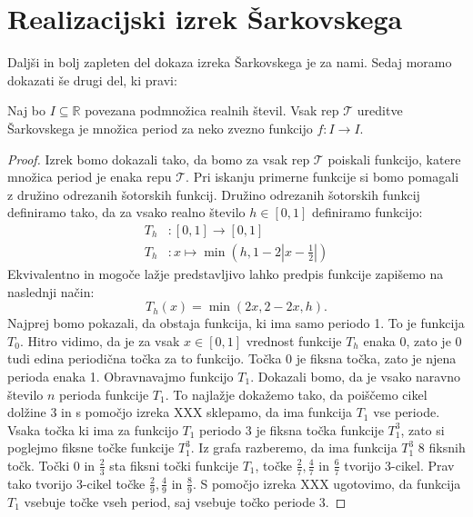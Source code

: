 \documentclass[mat2]{fmfdelo}
\newcommand{\R}{\mathbb R}
\begin{document}
\section{Realizacijski izrek Šarkovskega}\label{sec:realizacija}
Daljši in bolj zapleten del dokaza izreka Šarkovskega je za nami. Sedaj moramo dokazati še drugi del, ki pravi:
\begin{izrek}
Naj bo $I \subseteq \R$ povezana podmnožica realnih števil. Vsak rep $\mathcal{T}$ ureditve Šarkovskega je množica period za neko zvezno funkcijo $f:I \to I$.
\end{izrek}
\begin{proof}
Izrek bomo dokazali tako, da bomo za vsak rep $\mathcal{T}$ poiskali funkcijo, katere množica period je enaka repu $\mathcal{T}$. Pri iskanju primerne funkcije si bomo pomagali z družino odrezanih šotorskih funkcij. Družino odrezanih šotorskih funkcij definiramo tako, da za vsako realno število $h \in [0, 1]$ definiramo funkcijo:
\begin{equation*} %
\begin{split}
T_h &:  [0, 1] \to [0, 1] \\ 
T_h &: x \mapsto \min \left(h, 1- 2 \left|x-\frac{1}{2} \right|\right)
\end{split}
\end{equation*}
Ekvivalentno in mogoče lažje predstavljivo lahko predpis funkcije zapišemo na naslednji način:
\begin{equation*} %
T_h(x) = \min(2x, 2-2x, h).
\end{equation*}
Najprej bomo pokazali, da obstaja funkcija, ki ima samo periodo 1. To je funkcija $T_0$. Hitro vidimo, da je za vsak $x\in [0, 1]$ vrednost funkcije $T_h$ enaka 0, zato je 0 tudi edina periodična točka za to funkcijo. Točka 0 je fiksna točka, zato je njena perioda enaka 1.
Obravnavajmo funkcijo $T_1$. Dokazali bomo, da je vsako naravno število $n$ perioda funkcije $T_1$. To najlažje dokažemo tako, da poiščemo cikel dolžine 3 in s pomočjo izreka XXX sklepamo, da ima funkcija $T_1$ vse periode. Vsaka točka ki ima za funkcijo $T_1$ periodo 3 je fiksna točka funkcije $T_1^3$, zato si poglejmo fiksne točke funkcije $T_1^3$. Iz grafa razberemo, da ima funkcija $T_1^3$ 8 fiksnih točk. Točki 0 in $\frac{2}{3}$ sta fiksni točki funkcije $T_1$, točke $\frac{2}{7}, \frac{4}{7}$ in $\frac{6}{7}$ tvorijo 3-cikel. Prav tako tvorijo 3-cikel točke  $\frac{2}{9}, \frac{4}{9}$ in $\frac{8}{9}$. S pomočjo izreka XXX ugotovimo, da funkcija $T_1$ vsebuje točke vseh period, saj vsebuje točko periode 3.

\end{proof}
\end{document}
